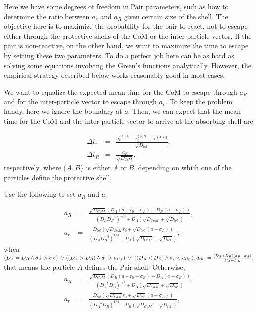 \documentclass[english]{article}
\begin{document}
Here we have some degrees of freedom in Pair parameters, such as how
to determine the ratio between $a_r$ and $a_R$ given certain size of
the shell.  The objective here is to maximize the probability for the
pair to react, not to escape either through the protective shells of
the CoM or the inter-particle vector.  If the pair is non-reactive, on
the other hand, we want to maximize the time to escape by setting
these two parameters.  To do a perfect job here can be as hard as 
solving some equations involving the Green's functions analytically.
However, the empirical strategy described below works reasonably
good in most cases.

We want to equalize the expected mean time for the CoM to escape
through $a_R$ and for the inter-particle vector to escape through
$a_r$.  To keep the problem handy, here we ignore the boundary
at $\sigma$.  Then, we can expect that the mean time for the CoM
and the inter-particle vector to arrive at the absorbing shell
are

\begin{eqnarray}
  \Delta t_r &=& \frac{a^{\{A,B\}}_r - r^{\{A,B\}}_0 - \sigma^{\{A,B\}}} 
  {\sqrt{D_{tot}}},\\
  \Delta t_R &=& \frac{a_R}{\sqrt{D_{CoM}}},
\end{eqnarray}
respectively, where ${\{A,B\}}$ is either $A$ or $B$, depending on which
one of the particles define the protective shell.


Use the following to set $a_R$ and $a_r$

\begin{eqnarray}
  a_R &=& \frac{\sqrt{D_{CoM}} 
    (D_A ( a - r_0 - \sigma_A ) + D_B (a - \sigma_A))}
  {(D_A {D_B}^5)^{1/4} + D_A( \sqrt{D_{CoM}} + \sqrt{D_{tot}})}, \\
  a_r &=& \frac{D_{tot} 
    (\sqrt{D_{CoM}} r_0 + \sqrt{D_{tot}} (a - \sigma_A))}
  {(D_A {D_B}^5)^{1/4} + D_A( \sqrt{D_{CoM}} + \sqrt{D_{tot}})},
\end{eqnarray}
when
\begin{math}
  ( D_A = D_B \wedge \sigma_A > \sigma_B ) \ \vee \ \\
  \left ( ( D_A > D_B ) \wedge a_r > a_{thr} \right ) \ \vee \
  \left ( ( D_A < D_B ) \wedge a_r < a_{thr} \right ), \\
  a_{thr} = \frac{( D_A + D_B ) (\sigma_B - \sigma_A)}{D_A - D_B},
\end{math}
that means the particle $A$ defines the Pair shell.  Otherwise,
\begin{eqnarray}
  a_R &=& \frac{\sqrt{D_{CoM}} 
    (D_B ( a - r_0 - \sigma_B ) + D_A (a - \sigma_B))}
  {({D_A}^5 D_B)^{1/4} + D_B( \sqrt{D_{CoM}} + \sqrt{D_{tot}})}, \\
  a_r &=& \frac{D_{tot} 
    (\sqrt{D_{CoM}} r_0 + \sqrt{D_{tot}} (a - \sigma_B))}
  {({D_A}^5 D_B)^{1/4} + D_B( \sqrt{D_{CoM}} + \sqrt{D_{tot}})},
\end{eqnarray}
\end{document}
